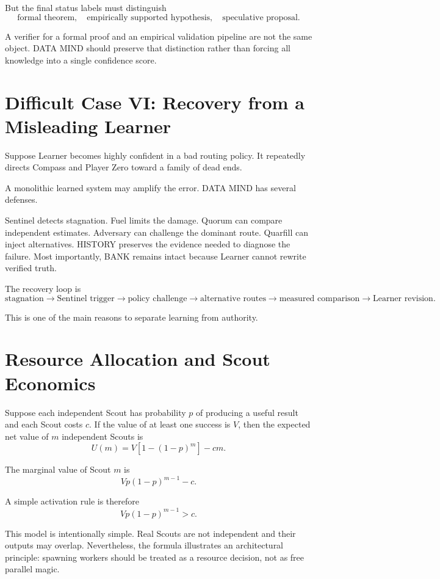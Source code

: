\documentclass[11pt]{article}
\begin{document}
But the final status labels must distinguish
\[
\text{formal theorem},
\quad
\text{empirically supported hypothesis},
\quad
\text{speculative proposal}.
\]

A verifier for a formal proof and an empirical validation pipeline are not the same object. DATA MIND should preserve that distinction rather than forcing all knowledge into a single confidence score.

\section{Difficult Case VI: Recovery from a Misleading Learner}

Suppose Learner becomes highly confident in a bad routing policy. It repeatedly directs Compass and Player Zero toward a family of dead ends.

A monolithic learned system may amplify the error. DATA MIND has several defenses.

Sentinel detects stagnation. Fuel limits the damage. Quorum can compare independent estimates. Adversary can challenge the dominant route. Quarfill can inject alternatives. HISTORY preserves the evidence needed to diagnose the failure. Most importantly, BANK remains intact because Learner cannot rewrite verified truth.

The recovery loop is
\[
\text{stagnation}
\to
\text{Sentinel trigger}
\to
\text{policy challenge}
\to
\text{alternative routes}
\to
\text{measured comparison}
\to
\text{Learner revision}.
\]

This is one of the main reasons to separate learning from authority.

\section{Resource Allocation and Scout Economics}

Suppose each independent Scout has probability $p$ of producing a useful result and each Scout costs $c$. If the value of at least one success is $V$, then the expected net value of $m$ independent Scouts is
\[
U(m)=V\left[1-(1-p)^m\right]-cm.
\]

The marginal value of Scout $m$ is
\[
V p(1-p)^{m-1}-c.
\]

A simple activation rule is therefore
\[
V p(1-p)^{m-1}>c.
\]

This model is intentionally simple. Real Scouts are not independent and their outputs may overlap. Nevertheless, the formula illustrates an architectural principle: spawning workers should be treated as a resource decision, not as free parallel magic.
\end{document}
